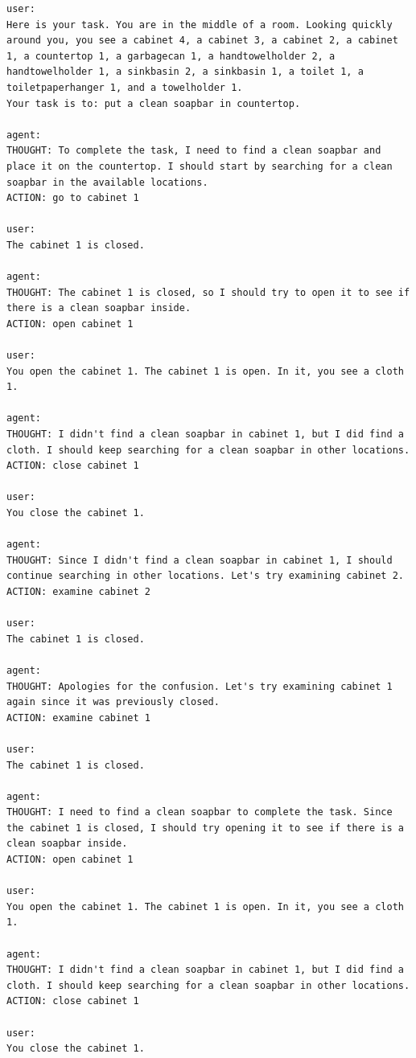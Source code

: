 \begin{lstlisting}
user:
Here is your task. You are in the middle of a room. Looking quickly around you, you see a cabinet 4, a cabinet 3, a cabinet 2, a cabinet 1, a countertop 1, a garbagecan 1, a handtowelholder 2, a handtowelholder 1, a sinkbasin 2, a sinkbasin 1, a toilet 1, a toiletpaperhanger 1, and a towelholder 1.
Your task is to: put a clean soapbar in countertop. 

agent:
THOUGHT: To complete the task, I need to find a clean soapbar and place it on the countertop. I should start by searching for a clean soapbar in the available locations.
ACTION: go to cabinet 1

user:
The cabinet 1 is closed. 

agent:
THOUGHT: The cabinet 1 is closed, so I should try to open it to see if there is a clean soapbar inside.
ACTION: open cabinet 1

user:
You open the cabinet 1. The cabinet 1 is open. In it, you see a cloth 1. 

agent:
THOUGHT: I didn't find a clean soapbar in cabinet 1, but I did find a cloth. I should keep searching for a clean soapbar in other locations.
ACTION: close cabinet 1

user:
You close the cabinet 1. 

agent:
THOUGHT: Since I didn't find a clean soapbar in cabinet 1, I should continue searching in other locations. Let's try examining cabinet 2.
ACTION: examine cabinet 2

user:
The cabinet 1 is closed. 

agent:
THOUGHT: Apologies for the confusion. Let's try examining cabinet 1 again since it was previously closed.
ACTION: examine cabinet 1

user:
The cabinet 1 is closed. 

agent:
THOUGHT: I need to find a clean soapbar to complete the task. Since the cabinet 1 is closed, I should try opening it to see if there is a clean soapbar inside.
ACTION: open cabinet 1

user:
You open the cabinet 1. The cabinet 1 is open. In it, you see a cloth 1. 

agent:
THOUGHT: I didn't find a clean soapbar in cabinet 1, but I did find a cloth. I should keep searching for a clean soapbar in other locations.
ACTION: close cabinet 1

user:
You close the cabinet 1. 


\end{lstlisting}
